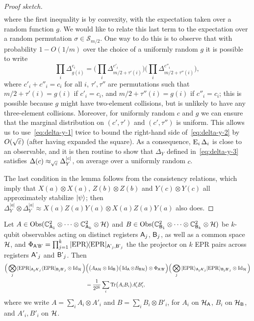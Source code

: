 \begin{proof}[Proof sketch]
\begin{align}
\end{align}
where the first inequality is by convexity, with the expectation taken over a random function $g$. We would like to relate this last term to the expectation over a random permutation $\sigma\in\mathcal{S}_{m/2}$. One way to do this is to observe that with  probability $1-O(1/m)$ over the choice of a uniformly random $g$ it is possible to write
$$ \prod_i \Delta_{g(i)}^{c_i} = \Big(\prod_i \Delta_{m/2+\tau'(i)}^{c'_i}\Big)\Big(\prod_i \Delta_{m/2+\tau''(i)}^{c''_i}\Big),$$
where $c'_i+c''_i=c_i$ for all $i$, $\tau',\tau''$ are permutations such that $m/2+\tau'(i)=g(i)$ if $c'_i=c_i$, and $m/2+\tau''(i)=g(i)$ if $c''_i=c_i$; this is possible because $g$ might have two-element collisions, but is unlikely to have any three-element collisions. Moreover, for uniformly random $c$ and $g$ we can ensure that the marginal distribution on $(c',\tau')$ and $(c',\tau'')$ is uniform.  This allows us to use~\eqref{eq:delta-y-1} twice to bound the right-hand side of~\eqref{eq:delta-y-2} by $O(\sqrt{\varepsilon})$ (after having expanded the square). As a consequence, $\mathop{\textsc{E}}_{i}\Delta_i$ is close to an observable, and it is then routine to show that $\Delta_Y$ defined in~\eqref{eq:delta-y-3} satisfies $\Delta(c) \approx_{\sqrt{\varepsilon}} \Delta_Y^{|c|}$, on average over a uniformly random $c$. 

The last condition in the lemma follows from the consistency relations, which imply that $X(a)\otimes X(a)$, $Z(b)\otimes Z(b)$ and $Y(c)\otimes Y(c)$ all approximately stabilize $|\psi\rangle$; then $\Delta_Y^{|a|} \otimes \Delta_Y^{|a|} \approx  X(a)Z(a)Y(a) \otimes X(a)Z(a)Y(a)$ also does. 
\end{proof}

\begin{claim}\label{claim:swap-tt}
Let $A\in \mathrm{Obs}(\mathbb{C}^2_{{\textsf{A}}_1}\otimes \cdots\otimes \mathbb{C}^2_{{\textsf{A}}_k} \otimes \mathcal{H})$ and $B\in \mathrm{Obs}(\mathbb{C}^2_{{\textsf{B}}_1}\otimes \cdots\otimes \mathbb{C}^2_{{\textsf{B}}_k}\otimes \mathcal{H})$ be $k$-qubit observables acting on distinct registers ${\textsf{A}}_j$, ${\textsf{B}}_j$, as well as a common space $\mathcal{H}$, and $\Phi_{{\textsf{A'B'}}} = \prod_{j=1}^k |{\rm EPR}\rangle\!\langle{\rm EPR}|_{{\textsf{A'}}_j,{\textsf{B'}}_j}$ the the projector on $k$ EPR pairs across registers ${\textsf{A'}}_j$ and ${\textsf{B'}}_j$.  Then 
\begin{align}
 \Big(\bigotimes_j \langle{\rm EPR}|_{{\textsf{A}}_j{\textsf{A'}}_j}\langle{\rm EPR}|_{{\textsf{B}}_j{\textsf{B'}}_j} \otimes \mathop{\rm Id}\nolimits_{\mathcal{H}} \Big)&\Big(\big(A_{{\textsf{A}}\mathcal{H}} \otimes \mathop{\rm Id}\nolimits_{\textsf{B}}\big)\big( \mathop{\rm Id}\nolimits_{\textsf{A}}\otimes B _{{\textsf{B}}\mathcal{H}}\big)\otimes \Phi_{{\textsf{A'B'}}}\Big) \Big(\bigotimes_j |{\rm EPR}\rangle_{{\textsf{A}}_j{\textsf{A'}}_j}|{\rm EPR}\rangle_{{\textsf{B}}_j{\textsf{B'}}_j} \otimes \mathop{\rm Id}\nolimits_{\mathcal{H}}\Big)\notag\\
& = \frac{1}{2^{2k}}\sum_i \mbox{\rm Tr}\big(A_i B_i\big) A'_iB'_i,\label{eq:swap}
\end{align}
where we write $A = \sum_i A_i \otimes A'_i$ and $B=\sum_i B_i\otimes B'_i$, for $A_i$ on $\mathcal{H}_{\textsf{A}}$, $B_i$ on $\mathcal{H}_{{\textsf{B}}}$, and $A'_i,B'_i$ on $\mathcal{H}$.
\end{claim}



